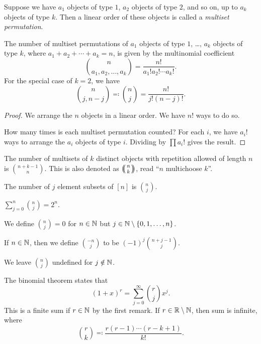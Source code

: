 \begin{definition*} \label{def:permutations:multiset}
    Suppose we have $a_1$ objects of type $1$, $a_2$ objects of type $2$,
    and so on, up to $a_k$ objects of type $k$.
    Then a linear order of these objects is called a \emph{multiset
    permutation}.
\end{definition*}
\begin{proposition}
    The number of multiset permutations of $a_1$ objects of type $1$,
    \dots, $a_k$ objects of type $k$, where $a_1 + a_2 + \cdots + a_k = n$,
    is given by the multinomial coefficient \[
        \binom{n}{a_1, a_2, \dots, a_k} = \frac{n!}{a_1!a_2!\cdots a_k!}.
    \] For the special case of $k = 2$, we have \[
        \binom{n}{j, n-j} \eqcolon \binom{n}{j} = \frac{n!}{j!(n-j)!}.
    \]
\end{proposition}
\begin{proof}
    We arrange the $n$ objects in a linear order.
    We have $n!$ ways to do so.

    How many times is each multiset permutation counted?
    For each $i$, we have $a_i!$ ways to arrange the $a_i$ objects of type
    $i$.
    Dividing by $\prod a_i!$ gives the result.
\end{proof}

\begin{proposition}
    The number of multisets of $k$ distinct objects with repetition allowed
    of length $n$ is $\binom{n+k-1}{n}$.
    This is also denoted as $\multichoose{n}{k}$, read
    ``$n$ multichoose $k$''.
\end{proposition}

\begin{proposition}
    The number of $j$ element subsets of $[n]$ is $\binom{n}{j}$.
\end{proposition}
\begin{corollary}
    $\sum_{j=0}^{n} \binom{n}{j} = 2^n$.
\end{corollary}

\begin{remarks}
    \item We define $\binom{n}{j} = 0$ for $n \in \mathbb{N}$ but
    $j \in \N \setminus \set{0, 1, \dots, n}$.
    \item If $n \in \mathbb{N}$, then we define $\binom{-n}{j}$ to be
    $(-1)^j \binom{n+j-1}{j}$.
    \item We leave $\binom{n}{j}$ undefined for $j \notin \mathbb{N}$.
    \item The binomial theorem states that \[
        (1+x)^r = \sum_{j=0}^{\infty} \binom{r}{j} x^j.
    \] This is a finite sum if $r \in \mathbb{N}$ by the first remark.
    If $r \in \mathbb{R} \setminus \mathbb{N}$, then sum is infinite, where \[
        \binom{r}{k} \eqcolon \frac{r(r-1)\cdots(r-k+1)}{k!}.
    \]
\end{remarks}

